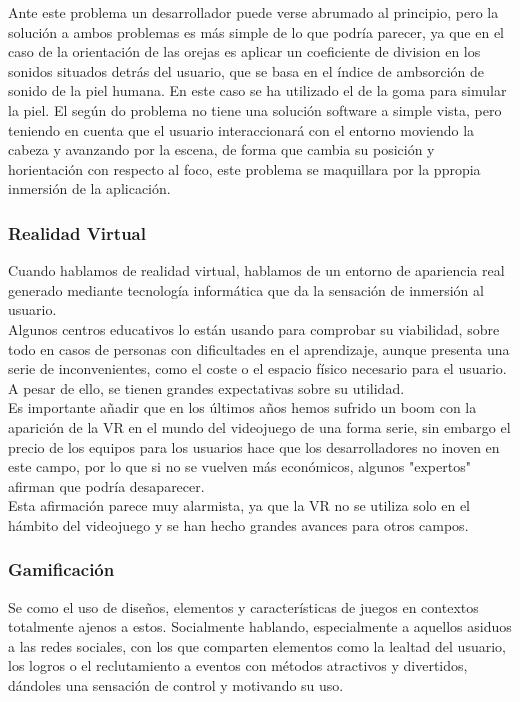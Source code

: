 \quad Ante este problema un desarrollador puede verse abrumado al principio, pero la solución a ambos problemas es más simple de lo que podría parecer, ya que en el caso de la orientación de las orejas es aplicar un coeficiente de division en los sonidos situados detrás del usuario, que se basa en el índice de ambsorción de sonido de la piel humana. En este caso se ha utilizado el de la goma para simular la piel. El según do problema no tiene una solución software a simple vista, pero teniendo en cuenta que el usuario interaccionará con el entorno moviendo la cabeza y avanzando por la escena, de forma que cambia su posición y horientación con respecto al foco, este problema se maquillara por la ppropia inmersión de la aplicación.\\ 

	\subsubsection{Realidad Virtual}
\quad Cuando hablamos de realidad virtual, hablamos de un entorno de apariencia real generado mediante tecnología informática que da la sensación de inmersión al usuario.\\ 

\quad Algunos centros educativos lo están usando para comprobar su viabilidad, sobre todo en casos de personas con dificultades en el aprendizaje, aunque presenta una serie de inconvenientes, como el coste o el espacio físico necesario para el usuario. A pesar de ello, se tienen grandes expectativas sobre su utilidad.\\

\quad Es importante añadir que en los últimos años hemos sufrido un boom con la aparición de la VR en el mundo del videojuego de una forma serie, sin embargo el precio de los equipos para los usuarios hace que los desarrolladores no inoven en este campo, por lo que si no se vuelven más económicos, algunos "expertos" afirman que podría desaparecer. \\

\quad Esta afirmación parece muy alarmista, ya que la VR no se utiliza solo en el hámbito del videojuego y se han hecho grandes avances para otros campos.\\

	\subsubsection{Gamificación}
\quad Se como el uso de diseños, elementos y características de juegos en contextos totalmente ajenos a estos. Socialmente hablando, especialmente a aquellos asiduos a las redes sociales, con los que comparten elementos como la lealtad del usuario, los logros o el reclutamiento a eventos con métodos atractivos y divertidos, dándoles una sensación de control y motivando su uso.\\

